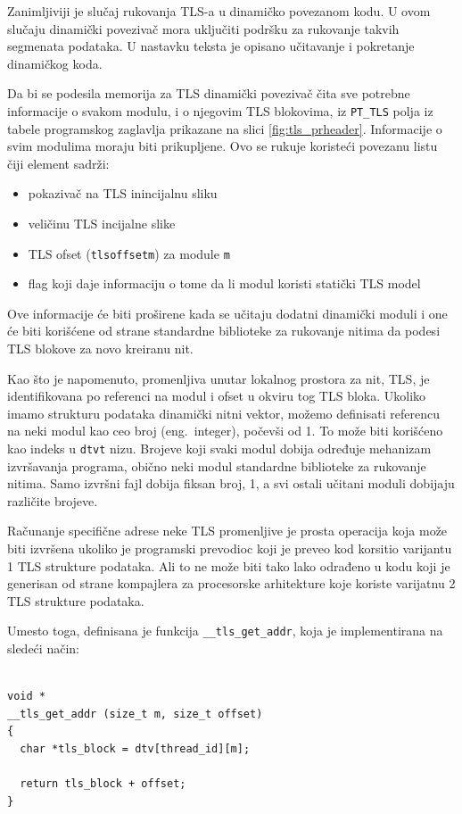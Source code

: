 \documentclass[12pt,oneside]{memoir}
\begin{document}
Zanimljiviji je slučaj rukovanja TLS-a u dinamičko povezanom kodu. U ovom slučaju dinamički povezivač mora uključiti podršku za rukovanje takvih segmenata podataka. U nastavku teksta je opisano učitavanje i pokretanje dinamičkog koda.

Da bi se podesila memorija za TLS dinamički povezivač čita sve potrebne informacije o svakom modulu, i o njegovim TLS blokovima, iz \texttt{PT\_TLS} polja iz tabele programskog zaglavlja prikazane na slici \ref{fig:tls_prheader}. Informacije o svim modulima moraju biti prikupljene. Ovo se rukuje koristeći povezanu listu čiji element sadrži:

\begin{itemize}
	\item pokazivač na TLS inincijalnu sliku
	\item veličinu TLS incijalne slike
	\item TLS ofset (\texttt{tlsoffsetm}) za module \texttt{m}
	\item flag koji daje informaciju o tome da li modul koristi statički TLS model
\end{itemize}

Ove informacije će biti proširene kada se učitaju dodatni dinamički moduli i one će biti korišćene od strane standardne biblioteke za rukovanje nitima da podesi TLS blokove za novo kreiranu nit.

Kao što je napomenuto, promenljiva unutar lokalnog prostora za nit, TLS, je identifikovana po referenci na modul i ofset u okviru tog TLS bloka. Ukoliko imamo strukturu podataka dinamički nitni vektor, možemo definisati referencu na neki modul kao ceo broj (eng.~integer), počevši od 1. To može biti korišćeno kao indeks u \texttt{dtvt} nizu. Brojeve koji svaki modul dobija određuje mehanizam izvršavanja programa, obično neki modul standardne biblioteke za rukovanje nitima. Samo izvršni fajl dobija fiksan broj, 1, a svi ostali učitani moduli dobijaju različite brojeve.

Računanje specifične adrese neke TLS promenljive je prosta operacija koja može biti izvršena ukoliko je programski prevodioc koji je preveo kod korsitio varijantu 1 TLS strukture podataka. Ali to ne može biti tako lako odrađeno u kodu koji je generisan od strane kompajlera za procesorske arhitekture koje koriste varijatnu 2 TLS strukture podataka.

Umesto toga, definisana je funkcija \texttt{\_\_tls\_get\_addr}, koja je implementirana na sledeći način:

\begin{lstlisting}

void *
__tls_get_addr (size_t m, size_t offset)
{
  char *tls_block = dtv[thread_id][m];
  
  return tls_block + offset;
}

\end{lstlisting}
\end{document}

